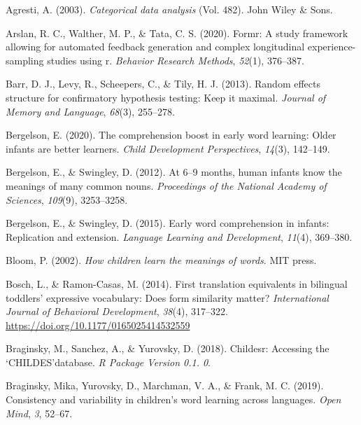 \documentclass[
  english,
  man,man,floatsintext]{apa6}
\newlength{\cslhangindent}
\newenvironment{CSLReferences}[2] %
 {%
  \setlength{\parindent}{0pt}
  \ifodd #1 \everypar{\setlength{\hangindent}{\cslhangindent}}\ignorespaces\fi
  \ifnum #2 > 0
  \setlength{\parskip}{#2\baselineskip}
  \fi
 }%
 {}
\begin{document}
\hypertarget{refs}{}
\begin{CSLReferences}{1}{0}
\leavevmode{}%
Agresti, A. (2003). \emph{Categorical data analysis} (Vol. 482). John Wiley \& Sons.

\leavevmode{}%
Arslan, R. C., Walther, M. P., \& Tata, C. S. (2020). Formr: A study framework allowing for automated feedback generation and complex longitudinal experience-sampling studies using r. \emph{Behavior Research Methods}, \emph{52}(1), 376--387.

\leavevmode{}%
Barr, D. J., Levy, R., Scheepers, C., \& Tily, H. J. (2013). Random effects structure for confirmatory hypothesis testing: Keep it maximal. \emph{Journal of Memory and Language}, \emph{68}(3), 255--278.

\leavevmode{}%
Bergelson, E. (2020). The comprehension boost in early word learning: Older infants are better learners. \emph{Child Development Perspectives}, \emph{14}(3), 142--149.

\leavevmode{}%
Bergelson, E., \& Swingley, D. (2012). At 6--9 months, human infants know the meanings of many common nouns. \emph{Proceedings of the National Academy of Sciences}, \emph{109}(9), 3253--3258.

\leavevmode{}%
Bergelson, E., \& Swingley, D. (2015). Early word comprehension in infants: Replication and extension. \emph{Language Learning and Development}, \emph{11}(4), 369--380.

\leavevmode{}%
Bloom, P. (2002). \emph{How children learn the meanings of words}. MIT press.

\leavevmode{}%
Bosch, L., \& Ramon-Casas, M. (2014). First translation equivalents in bilingual toddlers' expressive vocabulary: {Does} form similarity matter? \emph{International Journal of Behavioral Development}, \emph{38}(4), 317--322. \url{https://doi.org/10.1177/0165025414532559}

\leavevmode{}%
Braginsky, M., Sanchez, A., \& Yurovsky, D. (2018). Childesr: Accessing the `CHILDES'database. \emph{R Package Version 0.1. 0}.

\leavevmode{}%
Braginsky, Mika, Yurovsky, D., Marchman, V. A., \& Frank, M. C. (2019). Consistency and variability in children's word learning across languages. \emph{Open Mind}, \emph{3}, 52--67.


\end{CSLReferences}
\end{document}
